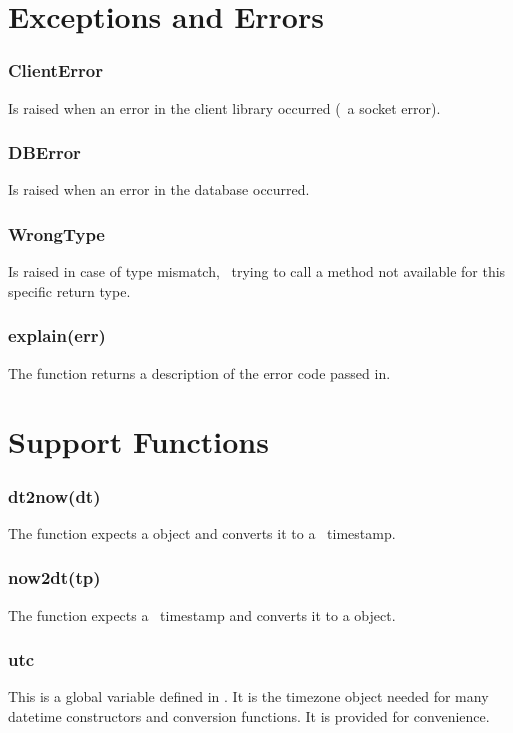 \section{Exceptions and Errors}
\subsubsection{ClientError}
Is raised when an error in the client library occurred
(\eg\ a socket error).

\subsubsection{DBError}
Is raised when an error in the database occurred.

\subsubsection{WrongType}
Is raised in case of type mismatch, \ie\
trying to call a method not available for
this specific return type.

\subsubsection{explain(err)}
The function  returns
a description of the error code passed in.

\section{Support Functions}\label{sec_supp}
\subsubsection{dt2now(dt)}
The function expects a 
object and converts it to a \nowdb\ timestamp.

\subsubsection{now2dt(tp)}
The function expects a \nowdb\ timestamp
and converts it to a  object.

\subsubsection{utc}
This is a global variable defined in .
It is the  timezone object needed
for many datetime constructors and conversion functions.
It is provided for convenience.

